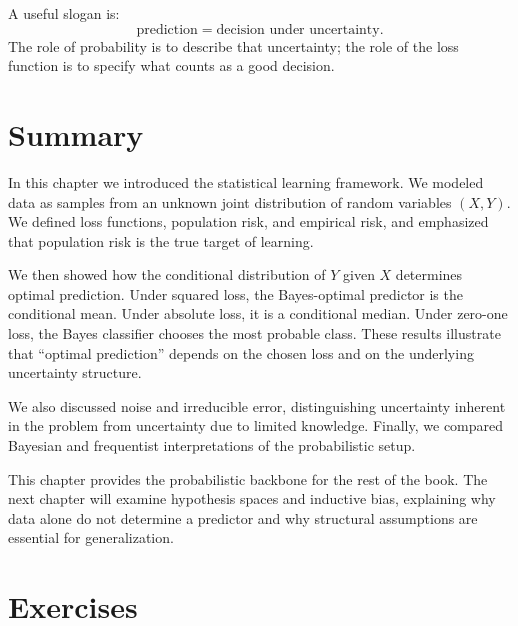 A useful slogan is:
\[
\text{prediction} = \text{decision under uncertainty}.
\]
The role of probability is to describe that uncertainty; the role of the loss function is to specify what counts as a good decision.

\section{Summary}

In this chapter we introduced the statistical learning framework. We modeled data as samples from an unknown joint distribution of random variables $(X,Y)$. We defined loss functions, population risk, and empirical risk, and emphasized that population risk is the true target of learning.

We then showed how the conditional distribution of $Y$ given $X$ determines optimal prediction. Under squared loss, the Bayes-optimal predictor is the conditional mean. Under absolute loss, it is a conditional median. Under zero-one loss, the Bayes classifier chooses the most probable class. These results illustrate that ``optimal prediction'' depends on the chosen loss and on the underlying uncertainty structure.

We also discussed noise and irreducible error, distinguishing uncertainty inherent in the problem from uncertainty due to limited knowledge. Finally, we compared Bayesian and frequentist interpretations of the probabilistic setup.

This chapter provides the probabilistic backbone for the rest of the book. The next chapter will examine hypothesis spaces and inductive bias, explaining why data alone do not determine a predictor and why structural assumptions are essential for generalization.

\section{Exercises}

